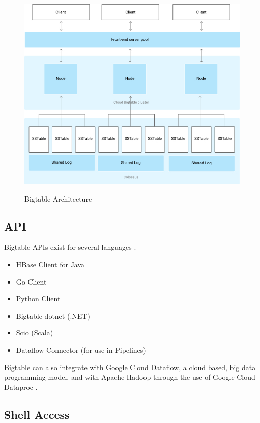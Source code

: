 \documentclass[9pt,twocolumn,twoside]{styles/osajnl}
\begin{document}
\begin{figure}[ht]
  \includegraphics[scale=0.45]{images/bigtable-architecture.jpg}
  \caption{Bigtable Architecture} \cite{www-bigtabledocoverview}
\end{figure}

\subsection{API}

Bigtable APIs exist for several languages \cite{www-bigtabledocapi}.

\vspace{-\topsep}
\begin{itemize}
\item HBase Client for Java
\item Go Client
\item Python Client
\item Bigtable-dotnet (.NET)
\item Scio (Scala)
\item Dataflow Connector (for use in Pipelines)
\end{itemize}

Bigtable can also integrate with Google Cloud Dataflow, a cloud based, big data programming model, and with Apache Hadoop through the use of Google Cloud Dataproc \cite{www-bigtabledocapi}.

\subsection{Shell Access}
\end{document}
